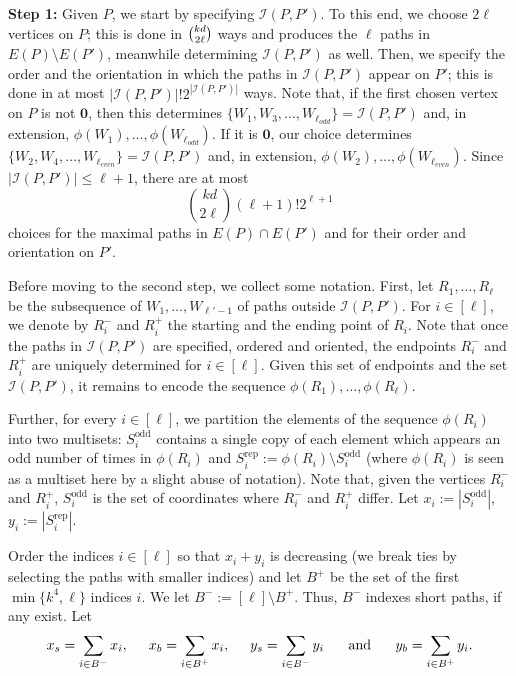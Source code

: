 \documentclass[reqno,final,a4paper]{amsart}
\theoremstyle{definition}
\newcommand{\cI}{\mathcal{I}}
\newcommand{\1}{\mathbbm{1}}
\begin{document}
\vspace{0.5em}
\noindent 
\textbf{Step 1:} Given $P$, we start by specifying $\cI(P,P')$. To this end, we choose $2\ell$ vertices on $P$; this is done in $\tbinom{kd}{2\ell}$ ways and produces the $\ell$ paths in $E(P)\setminus E(P')$, meanwhile determining $\cI(P,P')$ as well.
Then, we specify the order and the orientation in which the paths in $\mathcal{I}(P,P')$ appear on $P'$; this is done in at most $|\mathcal{I}(P,P')|! 2^{|\mathcal{I}(P,P')|}$ ways. 
Note that, if the first chosen vertex on $P$ is not $\textbf{0}$, then this determines $\{W_1,W_3,\ldots,W_{\ell_{odd}}\}=\mathcal{I}(P,P')$ and, in extension, $\phi(W_1),\ldots,\phi(W_{\ell_{odd}})$. 
If it is $\textbf{0}$, our choice determines $\{W_2,W_4,\ldots,W_{\ell_{even}}\}=\mathcal{I}(P,P')$ and, in extension, $\phi(W_2),\ldots,\phi(W_{\ell_{even}})$. 
Since $|\cI(P,P')|\leq \ell+1$, there are at most 
\begin{equation}\label{eq:step1}
    \binom{kd}{2\ell}(\ell+1)!2^{\ell+1}
\end{equation}
choices for the maximal paths in $E(P)\cap E(P')$ and for their order and orientation on $P'$. 

\vspace{3mm}

Before moving to the second step, we collect some notation.
First, let $R_1,\ldots,R_\ell$ be the subsequence of $W_1,\ldots,W_{\ell'-1}$ of paths outside $\cI(P,P')$. 
For $i\in [\ell]$, we denote by $R_i^-$ and $R_i^+$ the starting and the ending point of $R_i$. Note that once the paths in $\cI(P,P')$ are specified, ordered and oriented, the endpoints $R_i^-$ and $R_i^+$ are uniquely determined for $i\in [\ell]$. Given this set of endpoints and the set $\cI(P,P')$, it remains to encode the sequence $\phi(R_1),\ldots,\phi(R_{\ell})$.

Further, for every $i\in [\ell]$, we partition the elements of the sequence $\phi(R_i)$ into two multisets: $S_i^{\mathrm{odd}}$ contains a single copy of each element which appears an odd number of times in $\phi(R_i)$ and $S_i^{\mathrm{rep}}:=\phi(R_i)\setminus S_i^{\mathrm{odd}}$ (where $\phi(R_i)$ is seen as a multiset here by a slight abuse of notation).
Note that, given the vertices $R_i^-$ and $R_i^+$, $S_i^{\mathrm{odd}}$ is the set of coordinates where $R_i^-$ and $R_i^+$ differ. Let $x_i:=|S_i^{\mathrm{odd}}|$, $y_i:=|S_i^{\mathrm{rep}}|$.

Order the indices $i\in [\ell]$ so that $x_i+y_i$ is decreasing (we break ties by selecting the paths with smaller indices) and let $B^+$ be the set of the first $\min\{k^4,\ell\}$ indices $i$. We let $B^-:=[\ell]\setminus B^+$. Thus, $B^-$ indexes short paths, if any exist. Let 
\[x_s=\sum_{i\in B^-}x_i, \hspace{5mm} x_b=\sum_{i\in B^+}x_i,\hspace{5mm} y_s=\sum_{i\in B^-}y_i\hspace{5mm} \text{ and }\hspace{5mm}y_b=\sum_{i\in B^+}y_i.\] 
\end{document}
